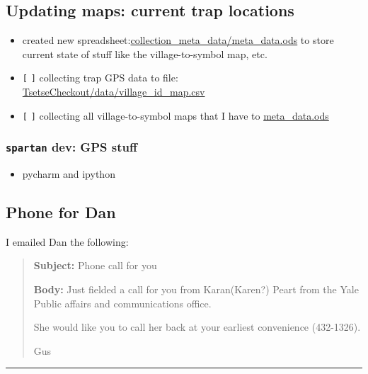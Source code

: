 \documentclass[letterpaper]{scrartcl}
\begin{document}
\subsection{Updating maps: current trap
locations}\label{updating-maps-current-trap-locations}

\begin{itemize}
\itemsep1pt\parskip0pt
\item
  created new
  spreadsheet:\href{file:///home/gus/Dropbox/uganda\%20data/collection_meta_data/meta_data.ods}{collection\_meta\_data/meta\_data.ods}
  to store current state of stuff like the village-to-symbol map, etc.
\item
  \texttt{{[}} \texttt{{]}} collecting trap GPS data to file:
  \href{file://CREATE_ME}{TsetseCheckout/data/village\_id\_map.csv}
\item
  \texttt{{[}} \texttt{{]}} collecting all village-to-symbol maps that I
  have to
  \href{file:///home/gus/Dropbox/repos/git/TsetseCheckout/TsetseCheckout/data/village_id_map.csv}{meta\_data.ods}
\end{itemize}

\subsubsection{\texttt{spartan} dev: GPS
stuff}\label{spartan-dev-gps-stuff}

\begin{itemize}
\itemsep1pt\parskip0pt
\item
  pycharm and ipython
\end{itemize}

\subsection{Phone for Dan}\label{phone-for-dan}

I emailed Dan the following:

\begin{quote}
\textbf{Subject:} Phone call for you

\textbf{Body:} Just fielded a call for you from Karan(Karen?) Peart from
the Yale Public affairs and communications office.

She would like you to call her back at your earliest convenience
(432-1326).

Gus
\end{quote}

\begin{center}\rule{0.5\linewidth}{\linethickness}\end{center}
\end{document}
